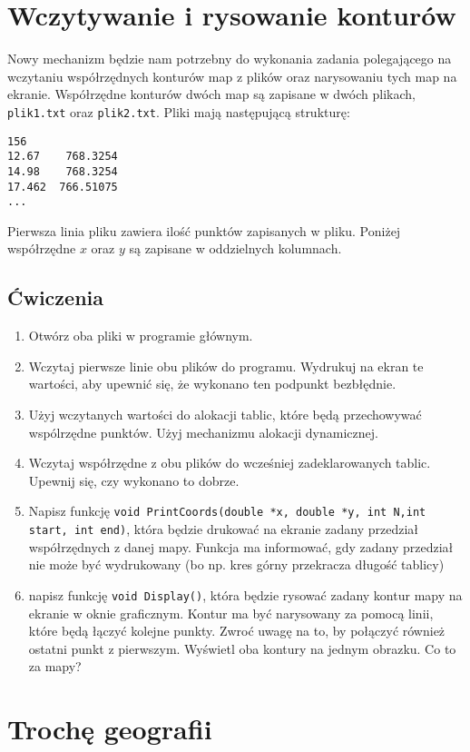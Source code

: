 \documentclass{instrukcja}
\begin{document}
\section*{Wczytywanie i rysowanie konturów}

Nowy mechanizm będzie nam potrzebny do wykonania zadania polegającego na wczytaniu współrzędnych konturów map z plików oraz narysowaniu tych map na ekranie. Współrzędne konturów dwóch map są zapisane w dwóch plikach, {\tt plik1.txt} oraz {\tt plik2.txt}. Pliki mają następującą strukturę:
\begin{verbatim}
156
12.67	 768.3254
14.98	 768.3254
17.462	766.51075
...
\end{verbatim}
Pierwsza linia pliku zawiera ilość punktów zapisanych w pliku. Poniżej współrzędne \(x\) oraz \(y\) są zapisane w oddzielnych kolumnach. 

\subsection*{Ćwiczenia}
\begin{enumerate}
\item Otwórz oba pliki w programie głównym.
\item Wczytaj pierwsze linie obu plików do programu. Wydrukuj na ekran te wartości, aby upewnić się, że wykonano ten podpunkt bezbłędnie.
\item Użyj wczytanych wartości do alokacji tablic, które będą przechowywać wspólrzędne punktów. Użyj mechanizmu alokacji dynamicznej.
\item Wczytaj współrzędne z obu plików do wcześniej zadeklarowanych tablic. Upewnij się, czy wykonano to dobrze.
\item Napisz funkcję {\tt void PrintCoords(double *x, double *y, int N,int start, int end)}, która będzie drukować na ekranie zadany przedział współrzędnych z danej mapy. Funkcja ma informować, gdy zadany przedział nie może być wydrukowany (bo np. kres górny przekracza długość tablicy)
\item napisz funkcję {\tt void Display()}, która będzie rysować zadany kontur mapy na ekranie w oknie graficznym. Kontur ma być narysowany za pomocą linii, które będą łączyć kolejne punkty. Zwroć uwagę na to, by połączyć również ostatni punkt z pierwszym. Wyświetl oba kontury na jednym obrazku. Co to za mapy?
\end{enumerate}

\section*{Trochę geografii}
\end{document}
